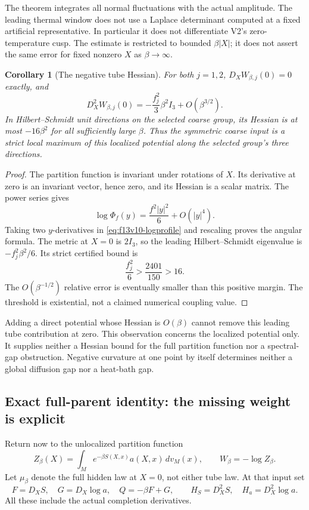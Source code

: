 \documentclass[11pt,oneside]{article}
\newtheorem{corollary}[theorem]{Corollary}
\begin{document}
The theorem integrates all normal fluctuations with the
actual amplitude. The leading thermal window does not
use a Laplace determinant computed at a fixed artificial
representative. In particular it does not differentiate
V2's zero-temperature cusp. The estimate is restricted
to bounded \(\beta|X|\); it does not assert the same
error for fixed nonzero \(X\) as \(\beta\to\infty\).

\begin{corollary}[The negative tube Hessian]
\label{cor:f13v10-hessian}
For both \(j=1,2\), \(D_XW_{\beta,j}(0)=0\) exactly, and
\[
 D_X^2W_{\beta,j}(0)
          =-\frac{f_j^2}{3}\beta^2 I_3+O(\beta^{3/2}).
\]
In Hilbert--Schmidt unit directions on the selected
coarse group, its Hessian is at most \(-16\beta^2\)
for all sufficiently large \(\beta\). Thus the symmetric
coarse input is a strict local maximum of this
\emph{localized} potential along the selected group's
three directions.
\end{corollary}

\begin{proof}
The partition function is invariant under rotations of
\(X\). Its derivative at zero is an invariant vector,
hence zero, and its Hessian is a scalar matrix.
The power series gives
\[
 \log\Phi_f(y)=\frac{f^2|y|^2}{6}+O(|y|^4).
\]
Taking two \(y\)-derivatives in
\eqref{eq:f13v10-logprofile} and rescaling proves the
angular formula. The metric at \(X=0\) is \(2I_3\),
so the leading Hilbert--Schmidt eigenvalue is
\(-f_j^2\beta^2/6\). Its strict certified bound is
\[
 \frac{f_j^2}{6}>\frac{2401}{150}>16.
\]
The \(O(\beta^{-1/2})\) relative error is eventually
smaller than this positive margin. The threshold is
existential, not a claimed numerical coupling value.
\end{proof}

Adding a direct potential whose Hessian is \(O(\beta)\)
cannot remove this leading tube contribution at zero.
This observation concerns the localized potential only.
It supplies neither a Hessian bound for the full
partition function nor a spectral-gap obstruction.
Negative curvature at one point by itself determines
neither a global diffusion gap nor a heat-bath gap.

\subsection{Exact full-parent identity: the missing weight is explicit}

Return now to the unlocalized partition function
\[
 Z_\beta(X)=\int_M e^{-\beta S(X,x)}a(X,x)\,dv_M(x),
 \qquad W_\beta=-\log Z_\beta.
\]
Let \(\mu_\beta\) denote the full hidden law at \(X=0\),
not either tube law. At that input set
\[
 F=D_XS,\quad G=D_X\log a,\quad Q=-\beta F+G,
 \qquad H_S=D_X^2S,\quad H_a=D_X^2\log a.
\]
All these include the actual completion derivatives.
\end{document}
